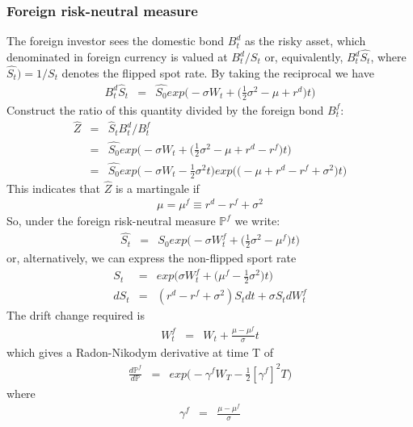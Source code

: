 \subsubsection{Foreign risk-neutral measure}
The foreign investor sees the domestic bond $B_{t}^{d}$ as the risky asset, which denominated in foreign currency is valued at $B_{t}^{d} / S_{t}$ or, equivalently, $B_{t}^{d}\hat{S_{t}}$,
where $\hat{S_{t}} )= 1/ S_{t}$ denotes the flipped spot rate. By taking the reciprocal we have
\begin{eqnarray}
	B_{t}^{d}\hat{S}_{t} &=& \hat{S_{0}}exp\bigg(-\sigma W_{t} + \bigg(\frac{1}{2}\sigma^{2} - \mu + r^{d}\bigg)t\bigg)
\end{eqnarray}
Construct the ratio of this quantity divided by the foreign bond $B_{t}^{f}$:
\begin{eqnarray}
	\nonumber
	\hat{Z} &=& \hat{S}_{t}B_{t}^{d} / B_{t}^{f}\\
	\nonumber
	&=& \hat{S_{0}}exp\bigg(-\sigma W_{t} + \bigg(\frac{1}{2}\sigma^{2} - \mu + r^{d} - r^{f}\bigg)t\bigg)\\
	&=& \hat{S_{0}}exp\bigg(-\sigma W_{t} - \frac{1}{2}\sigma^{2}t\bigg)exp\bigg(\bigg(-\mu + r^{d} - r^{f} + \sigma^{2}\bigg)t\bigg)
\end{eqnarray}
This indicates that $\hat{Z}$ is a martingale if
\begin{eqnarray}
	\mu = \mu^{f} \equiv r^{d} - r^{f} + \sigma^{2}
\end{eqnarray}
So, under the foreign risk-neutral measure $\mathbb{P}^{f}$ we write:
\begin{eqnarray}
	\hat{S_{t}} &=& S_{0}exp\bigg(-\sigma W_{t}^{f} + \bigg(\frac{1}{2}\sigma^{2} - \mu^{f}\bigg)t\bigg)
\end{eqnarray}
or, alternatively, we can express the non-flipped sport rate
\begin{eqnarray}
	S_{t} &=& exp\bigg(\sigma W_{t}^{f} + \bigg(\mu^{f} - \frac{1}{2}\sigma^{2}\bigg)t\bigg)\\
	dS_{t} &=& (r^{d} - r^{f} + \sigma^{2})S_{t}dt + \sigma S_{t}dW_{t}^{f}
\end{eqnarray}
The drift change required is
\begin{eqnarray}
	W_{t}^{f} &=& W_{t} + \frac{\mu -\mu^{f}}{\sigma}t
\end{eqnarray}
which gives a Radon-Nikodym derivative at time T of
\begin{eqnarray}
\frac{d\mathbb{P}^{f}}{d\mathbb{P}} &=& exp\bigg(-\gamma^{f}W_{T} - \frac{1}{2}[\gamma^{f}]^{2}T\bigg)
\end{eqnarray}
where
\begin{eqnarray}
\gamma^{f} &=& \frac{\mu - \mu^{f}}{\sigma}
\end{eqnarray}